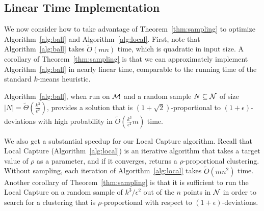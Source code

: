 \subsection{Linear Time Implementation}
We now consider how to take advantage of Theorem~\ref{thm:sampling} to optimize Algorithm~\ref{alg:ball} and Algorithm~\ref{alg:local}. First, note that Algorithm~\ref{alg:ball} takes $\tilde{O}(m n)$ time, which is quadratic in input size. %
A corollary of Theorem~\ref{thm:sampling} is that we can approximately implement Algorithm~\ref{alg:ball} in nearly linear time, comparable to the running time of the standard $k$-means heuristic.

\begin{corollary} 
\label{cor:fastGreedy}
Algorithm~\ref{alg:ball}, when run on $\mathcal{M}$ and a random sample $N \subseteq \mathcal {N}$ of size $|N| = \tilde{\Theta}\left(\frac{k^3}{\epsilon^2}\right)$, provides a solution that is $(1+\sqrt{2})$-proportional to $(1+\epsilon)$-deviations with high probability in $\tilde{O}\left( \frac{k^3}{\epsilon^2} m \right)$ time.
\end{corollary}

We also get a substantial speedup for our Local Capture algorithm. Recall that Local Capture (Algorithm~\ref{alg:local}) is an iterative algorithm that takes a target value of $\rho$ as a parameter, and if it converges, returns a $\rho$-proportional clustering. Without sampling, each iteration of Algorithm~\ref{alg:local} takes $\tilde{O}(m n^2)$ time. Another corollary of Theorem~\ref{thm:sampling} is that it is sufficient to run the Local Capture on a random sample of $k^3/\epsilon^2$ out of the $n$ points in $\mathcal {N}$ in order to search for a clustering that is $\rho$-proportional with respect to $(1+\epsilon)$-deviations.

